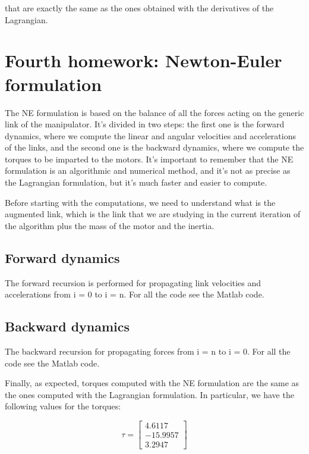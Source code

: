 \documentclass{article}
\begin{document}
that are exactly the same as the ones obtained with the derivatives of the Lagrangian.




\section{Fourth homework: Newton-Euler formulation}
\justify

The NE formulation is based on the balance of all the forces acting on the generic link of
the manipulator. It's divided in two steps: the first one is the forward dynamics, where we compute the linear and angular velocities and accelerations of the links, and the second one is the backward dynamics, where we compute the torques to be imparted to the motors.
It's important to remember that the NE formulation is an algorithmic and numerical method, and it's not as precise as the Lagrangian formulation, but it's much faster and easier to compute.

Before starting with the computations, we need to understand what is the augmented link, which is the link that we are studying in the current iteration of the algorithm plus the mass of the motor and the inertia.



\subsection{Forward dynamics}

The forward recursion is performed for propagating link velocities and accelerations
from i = 0 to i = n.
For all the code see the Matlab code.

\subsection{Backward dynamics}

The backward recursion for propagating forces from i = n to i = 0.
For all the code see the Matlab code.

\vspace{1cm}
Finally, as expected, torques computed with the NE formulation are the same as the ones computed with the Lagrangian formulation.
In particular, we have the following values for the torques:

\begin{equation}
    \tau = \begin{bmatrix}
        4.6117   \\
        -15.9957 \\
        3.2947
    \end{bmatrix}
\end{equation}
\end{document}
